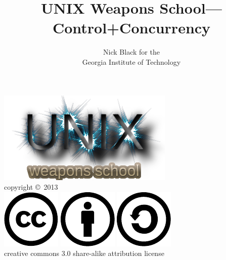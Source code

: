 \documentclass[mathserif,xcolor={dvipsnames,table}]{beamer}
\title{UNIX Weapons School---Control+Concurrency}
\date{}
\author{Nick Black for the\\
Georgia Institute of Technology
}
\begin{document}
\begin{frame}
\titlepage
\begin{center}
\includegraphics[scale=0.33]{images/uws.png}\\
\vspace{.1in}
\tiny{copyright \copyright\ 2013}\\
\includegraphics[scale=.25]{images/cc-logo.pdf}
\includegraphics[scale=.25]{images/cc-new.pdf}
\includegraphics[scale=.25]{images/cc-share.pdf}\\
\tiny{creative commons 3.0 share-alike attribution license}
\end{center}
\end{frame}
\end{document}
